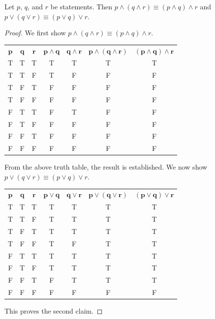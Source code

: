 \begin{proposition}
    Let $p$, $q$, and $r$ be statements. Then $p \land (q \land r) \equiv (p \land q) \land r$ and $p \lor (q \lor r) \equiv (p \lor q) \lor r$.
\end{proposition}
\begin{proof}
    We first show $p \land (q \land r) \equiv (p \land q) \land r$.
    \begin{table}[H]
        \centering
        \begin{tabular}{|c|c|c||c|c||c|c|}
            \hline
            $\boldsymbol{p}$ & $\boldsymbol{q}$ & $\boldsymbol{r}$ & $\boldsymbol{p \land q}$ & $\boldsymbol{q \land r}$ & $\boldsymbol{p \land (q \land r)}$ & $\boldsymbol{(p \land q) \land r}$ \\ \hhline{|=|=|=#=|=#=|=|}
            T & T & T & T & T & T & T \\ \hline
            T & T & F & T & F & F & F \\ \hline
            T & F & T & F & F & F & F \\ \hline
            T & F & F & F & F & F & F \\ \hline
            F & T & T & F & T & F & F \\ \hline
            F & T & F & F & F & F & F \\ \hline
            F & F & T & F & F & F & F \\ \hline
            F & F & F & F & F & F & F \\ \hline
        \end{tabular}
    \end{table}
    From the above truth table, the result is established. We now show $p \lor (q \lor r) \equiv (p \lor q) \lor r$.
    \begin{table}[H]
        \centering
        \begin{tabular}{|c|c|c||c|c||c|c|}
            \hline
            $\boldsymbol{p}$ & $\boldsymbol{q}$ & $\boldsymbol{r}$ & $\boldsymbol{p \lor q}$ & $\boldsymbol{q \lor r}$ & $\boldsymbol{p \lor (q \lor r)}$ & $\boldsymbol{(p \lor q) \lor r}$ \\ \hhline{|=|=|=#=|=#=|=|}
            T & T & T & T & T & T & T \\ \hline
            T & T & F & T & T & T & T \\ \hline
            T & F & T & T & T & T & T \\ \hline
            T & F & F & T & F & T & T \\ \hline
            F & T & T & T & T & T & T \\ \hline
            F & T & F & T & T & T & T \\ \hline
            F & F & T & F & T & T & T \\ \hline
            F & F & F & F & F & F & F \\ \hline
        \end{tabular}
    \end{table}
    This proves the second claim.
\end{proof}

